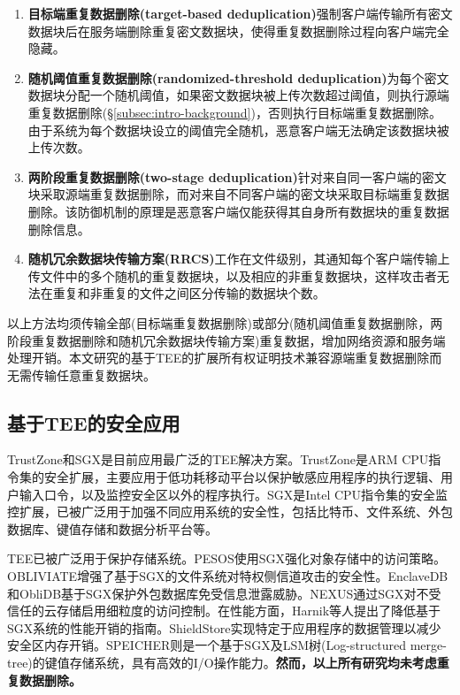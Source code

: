 \begin{enumerate}[leftmargin=*]
    \item \textbf{目标端重复数据删除(target-based deduplication)}\cite{harnik2010side}强制客户端传输所有密文数据块后在服务端删除重复密文数据块，使得重复数据删除过程向客户端完全隐藏。
    \item \textbf{随机阈值重复数据删除(randomized-threshold deduplication)}\cite{harnik2010side}为每个密文数据块分配一个随机阈值，如果密文数据块被上传次数超过阈值，则执行源端重复数据删除(\S\ref{subsec:intro-background})，否则执行目标端重复数据删除。由于系统为每个数据块设立的阈值完全随机，恶意客户端无法确定该数据块被上传次数。
    \item \textbf{两阶段重复数据删除(two-stage deduplication)}\cite{li2015cdstore}针对来自同一客户端的密文块采取源端重复数据删除，而对来自不同客户端的密文块采取目标端重复数据删除。该防御机制的原理是恶意客户端仅能获得其自身所有数据块的重复数据删除信息。
    \item \textbf{随机冗余数据块传输方案(RRCS)}\cite{zuo2018mitigating}工作在文件级别，其通知每个客户端传输上传文件中的多个随机的重复数据块，以及相应的非重复数据块，这样攻击者无法在重复和非重复的文件之间区分传输的数据块个数。 
\end{enumerate}

以上方法均须传输全部(目标端重复数据删除)或部分(随机阈值重复数据删除，两阶段重复数据删除和随机冗余数据块传输方案)重复数据，增加网络资源和服务端处理开销。本文研究的基于TEE的扩展所有权证明技术兼容源端重复数据删除而无需传输任意重复数据块。 

\subsection{基于TEE的安全应用}
\label{subsec:compare-tee}

TrustZone和SGX是目前应用最广泛的TEE解决方案\cite{pinto19}。TrustZone是ARM CPU指令集的安全扩展，主要应用于低功耗移动平台以保护敏感应用程序的执行逻辑\cite{rubinov2016automated}、用户输入口令\cite{ying2018truz}，以及监控安全区以外的程序执行\cite{azab2014hypervision}。SGX是Intel CPU指令集的安全监控扩展，已被广泛用于加强不同应用系统的安全性，包括比特币\cite{matetic19BITE}、文件系统\cite{ahmad2018OBLIVIATE,shinde20}、外包数据库\cite{eskandarian17,priebe18,sun21}、键值存储\cite{mishra2018Oblix,bailleu2019SPEICHER,kim2019ShieldStore,bailleu2021Avocado}和数据分析平台\cite{schuster15, zheng2017Opaque, bowe2020ZEXE}等。

TEE已被广泛用于保护存储系统。PESOS\cite{krahn2018PESOS}使用SGX强化对象存储中的访问策略。OBLIVIATE\cite{ahmad2018OBLIVIATE}增强了基于SGX的文件系统对特权侧信道攻击的安全性。EnclaveDB\cite{priebe18}和ObliDB\cite{eskandarian19}基于SGX保护外包数据库免受信息泄露威胁。NEXUS\cite{djoko2019NEXUS}通过SGX对不受信任的云存储启用细粒度的访问控制。在性能方面，Harnik等人\cite{harnik2018SGX}提出了降低基于SGX系统的性能开销的指南。ShieldStore\cite{kim2019ShieldStore}实现特定于应用程序的数据管理以减少安全区内存开销。SPEICHER\cite{bailleu2019SPEICHER}则是一个基于SGX及LSM树(Log-structured merge-tree)\cite{LSMT}的键值存储系统，具有高效的I/O操作能力。\textbf{然而，以上所有研究均未考虑重复数据删除。}

